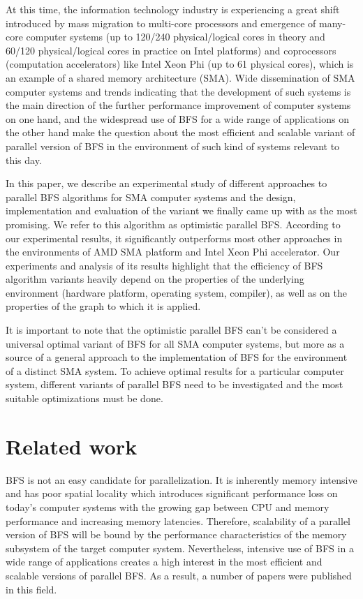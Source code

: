 \documentclass[letterpaper]{article}
\begin{document}
		At this time, the information technology industry is experiencing a great shift introduced by mass migration to multi-core processors and  emergence of many-core computer systems (up to 120/240 physical/logical cores in theory and 60/120 physical/logical cores in practice on Intel platforms) and coprocessors (computation accelerators) like Intel Xeon Phi (up to 61 physical cores), which is an example of a shared memory architecture (SMA).
		Wide dissemination of SMA computer systems and trends indicating that the development of such systems is the main direction of the further performance improvement of computer systems on one hand, and the widespread use of BFS for a wide range of applications on the other hand make the question about the most efficient and scalable variant of parallel version of BFS in the environment of such kind of systems relevant to this day.
				
		In this paper, we describe an experimental study of different approaches to parallel BFS algorithms for SMA computer systems and the design, implementation and evaluation of the variant we finally came up with as the most promising.
		We refer to this algorithm as optimistic parallel BFS.
		According to our experimental results, it significantly outperforms most other approaches in the environments of AMD SMA platform and Intel Xeon Phi accelerator.
		Our experiments and analysis of its results highlight that the efficiency of BFS algorithm variants heavily depend on the properties of the underlying environment (hardware platform, operating system, compiler), as well as on the properties of the graph to which it is applied. 
		
		It is important to note that the optimistic parallel BFS can't be considered a universal optimal variant of BFS for all SMA computer systems, but more as a source of a general approach to the implementation of BFS for the environment of a distinct SMA system.
		To achieve optimal results for a particular computer system, different variants of parallel BFS need to be investigated and the most suitable optimizations must be done.

	\section{Related work} \label{sec:rewo} %
		BFS is not an easy candidate for parallelization.
		It is inherently memory intensive and has poor spatial locality which introduces significant performance loss on today's computer systems with the growing gap between CPU and memory performance and increasing memory latencies.
		Therefore, scalability of a parallel version of BFS will be bound by the performance characteristics of the memory subsystem of the target computer system. 
		Nevertheless, intensive use of BFS in a wide range of applications creates a high interest in the most efficient and scalable versions of parallel BFS.
		As a result, a number of papers were published in this field. 
		
\end{document}
